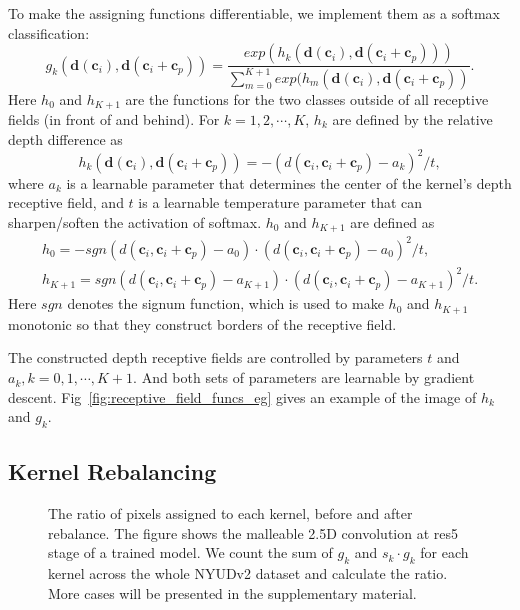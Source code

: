 \documentclass[runningheads]{llncs}
\begin{document}
To make the assigning functions differentiable, we implement them as a softmax classification:
\begin{equation}
  g_k(\mathbf{d}(\mathbf{c}_i), \mathbf{d}(\mathbf{c}_i+\mathbf{c}_p))
  = \frac{exp(h_k(\mathbf{d}(\mathbf{c}_i), \mathbf{d}(\mathbf{c}_i+\mathbf{c}_p)))}
  {\sum_{m=0}^{K+1}exp(h_m(\mathbf{d}(\mathbf{c}_i), \mathbf{d}(\mathbf{c}_i+\mathbf{c}_p))}.
\end{equation}
Here $h_0$ and $h_{K+1}$ are the functions for the two classes outside of all receptive fields (in front of and behind).
For $k=1,2,\cdots,K$, $h_k$ are defined by the relative depth difference as
\begin{equation}
  h_k(\mathbf{d}(\mathbf{c}_i), \mathbf{d}(\mathbf{c}_i+\mathbf{c}_p)) =
  -(d(\mathbf{c}_i, \mathbf{c}_i+\mathbf{c}_p) - a_k)^2/t,
\end{equation}
where $a_k$ is a learnable parameter that determines the center of the kernel's depth receptive field, and $t$ is a learnable temperature parameter that can sharpen/soften the activation of softmax.
$h_0$ and $h_{K+1}$ are defined as
\begin{equation}
  \begin{gathered}
    h_0 = -sgn(d(\mathbf{c}_i, \mathbf{c}_i+\mathbf{c}_p) - a_0)
    \cdot
    (d(\mathbf{c}_i, \mathbf{c}_i+\mathbf{c}_p) - a_0)^2/t, \\
    h_{K+1} = sgn(d(\mathbf{c}_i, \mathbf{c}_i+\mathbf{c}_p) - a_{K+1})
    \cdot
    (d(\mathbf{c}_i, \mathbf{c}_i+\mathbf{c}_p) - a_{K+1})^2/t.
  \end{gathered}
\end{equation}
Here $sgn$ denotes the signum function, which is used to make $h_0$ and $h_{K+1}$ monotonic so that they construct borders of the receptive field.

The constructed depth receptive fields are controlled by parameters $t$ and $a_k, k=0,1,\cdots,K+1$.
And both sets of parameters are learnable by gradient descent.
Fig~\ref{fig:receptive_field_funcs_eg} gives an example of the image of $h_k$ and $g_k$.


\subsection{Kernel Rebalancing}

\begin{figure}[htbp]
  \centering
  \caption{
    The ratio of pixels assigned to each kernel, before and after rebalance.
    The figure shows the malleable 2.5D convolution at res5 stage of a trained model.
    We count the sum of $g_k$ and $s_k\cdot g_k$ for each kernel across the whole NYUDv2 dataset and calculate the ratio.
    More cases will be presented in the supplementary material.
  }
  \label{fig:rebalance}
\end{figure}
\end{document}
